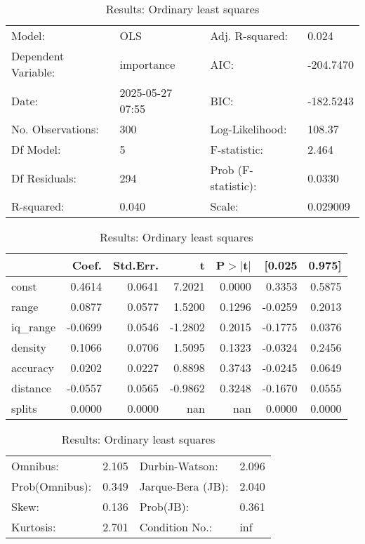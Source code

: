 \begin{table}
\caption{Results: Ordinary least squares}
\label{}
\begin{center}
\begin{tabular}{llll}
\hline
Model:              & OLS              & Adj. R-squared:     & 0.024      \\
Dependent Variable: & importance       & AIC:                & -204.7470  \\
Date:               & 2025-05-27 07:55 & BIC:                & -182.5243  \\
No. Observations:   & 300              & Log-Likelihood:     & 108.37     \\
Df Model:           & 5                & F-statistic:        & 2.464      \\
Df Residuals:       & 294              & Prob (F-statistic): & 0.0330     \\
R-squared:          & 0.040            & Scale:              & 0.029009   \\
\hline
\end{tabular}
\end{center}

\begin{center}
\begin{tabular}{lrrrrrr}
\hline
          &   Coef. & Std.Err. &       t & P$> |$t$|$ &  [0.025 & 0.975]  \\
\hline
const     &  0.4614 &   0.0641 &  7.2021 &      0.0000 &  0.3353 & 0.5875  \\
range     &  0.0877 &   0.0577 &  1.5200 &      0.1296 & -0.0259 & 0.2013  \\
iq\_range & -0.0699 &   0.0546 & -1.2802 &      0.2015 & -0.1775 & 0.0376  \\
density   &  0.1066 &   0.0706 &  1.5095 &      0.1323 & -0.0324 & 0.2456  \\
accuracy  &  0.0202 &   0.0227 &  0.8898 &      0.3743 & -0.0245 & 0.0649  \\
distance  & -0.0557 &   0.0565 & -0.9862 &      0.3248 & -0.1670 & 0.0555  \\
splits    &  0.0000 &   0.0000 &     nan &         nan &  0.0000 & 0.0000  \\
\hline
\end{tabular}
\end{center}

\begin{center}
\begin{tabular}{llll}
\hline
Omnibus:       & 2.105 & Durbin-Watson:    & 2.096  \\
Prob(Omnibus): & 0.349 & Jarque-Bera (JB): & 2.040  \\
Skew:          & 0.136 & Prob(JB):         & 0.361  \\
Kurtosis:      & 2.701 & Condition No.:    & inf    \\
\hline
\end{tabular}
\end{center}
\end{table}
